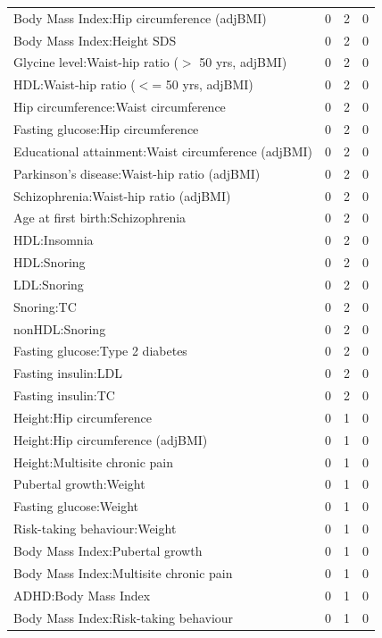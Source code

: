 \begin{table}[ht]
\begin{tabular}{lrrr}
  Body Mass Index:Hip circumference (adjBMI) &   0 &   2 &   0 \\ 
  Body Mass Index:Height SDS &   0 &   2 &   0 \\ 
  Glycine level:Waist-hip ratio ($>$ 50 yrs, adjBMI) &   0 &   2 &   0 \\ 
  HDL:Waist-hip ratio ($<$= 50 yrs, adjBMI) &   0 &   2 &   0 \\ 
  Hip circumference:Waist circumference &   0 &   2 &   0 \\ 
  Fasting glucose:Hip circumference &   0 &   2 &   0 \\ 
  Educational attainment:Waist circumference (adjBMI) &   0 &   2 &   0 \\ 
  Parkinson's disease:Waist-hip ratio (adjBMI) &   0 &   2 &   0 \\ 
  Schizophrenia:Waist-hip ratio (adjBMI) &   0 &   2 &   0 \\ 
  Age at first birth:Schizophrenia &   0 &   2 &   0 \\ 
  HDL:Insomnia &   0 &   2 &   0 \\ 
  HDL:Snoring &   0 &   2 &   0 \\ 
  LDL:Snoring &   0 &   2 &   0 \\ 
  Snoring:TC &   0 &   2 &   0 \\ 
  nonHDL:Snoring &   0 &   2 &   0 \\ 
  Fasting glucose:Type 2 diabetes &   0 &   2 &   0 \\ 
  Fasting insulin:LDL &   0 &   2 &   0 \\ 
  Fasting insulin:TC &   0 &   2 &   0 \\ 
  Height:Hip circumference &   0 &   1 &   0 \\ 
  Height:Hip circumference (adjBMI) &   0 &   1 &   0 \\ 
  Height:Multisite chronic pain &   0 &   1 &   0 \\ 
  Pubertal growth:Weight &   0 &   1 &   0 \\ 
  Fasting glucose:Weight &   0 &   1 &   0 \\ 
  Risk-taking behaviour:Weight &   0 &   1 &   0 \\ 
  Body Mass Index:Pubertal growth &   0 &   1 &   0 \\ 
  Body Mass Index:Multisite chronic pain &   0 &   1 &   0 \\ 
  ADHD:Body Mass Index &   0 &   1 &   0 \\ 
  Body Mass Index:Risk-taking behaviour &   0 &   1 &   0 \\ 

\end{tabular}
\end{table}
